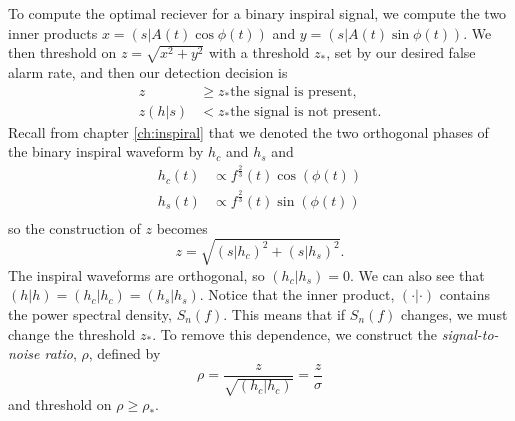 To compute the optimal reciever for a binary inspiral signal, we compute the
two inner products $x = (s|A(t)\cos\phi(t))$ and $y = (s|A(t)\sin\phi(t))$. We
then threshold on $z = \sqrt{x^2+y^2}$ with a threshold $z_\ast$, set by our
desired false alarm rate, and then our detection decision is
\begin{equation}
\begin{split}
z &\ge z_* \text{the signal is present}, \\
z(h|s) &< z_* \text{the signal is not present}.
\end{split}
\end{equation}
Recall from chapter \ref{ch:inspiral} that we denoted the two orthogonal
phases of the binary inspiral waveform by $h_c$ and $h_s$ and
\begin{align}
h_c(t) &\propto f^\frac{2}{3}(t) \cos(\phi(t)) \\
h_s(t) &\propto f^\frac{2}{3}(t) \sin(\phi(t)) \\
\end{align}
so the construction of $z$ becomes
\begin{equation}
z = \sqrt{(s|h_c)^2 + (s|h_s)^2}.
\end{equation}
The inspiral waveforms are orthogonal, so $(h_c|h_s) = 0$. We can also see
that $(h|h) = (h_c|h_c) = (h_s|h_s)$. Notice that the inner product,
$(\cdot|\cdot)$ contains the power spectral density, $S_n(f)$. This means that
if $S_n(f)$ changes, we must change the threshold $z_\ast$. To remove this
dependence, we construct the \emph{signal-to-noise ratio}, $\rho$, defined by
\begin{equation}
\rho = \frac{z}{\sqrt{(h_c|h_c)}} = \frac{z}{\sigma}
\end{equation}
and threshold on $\rho \ge \rho_\ast$.

